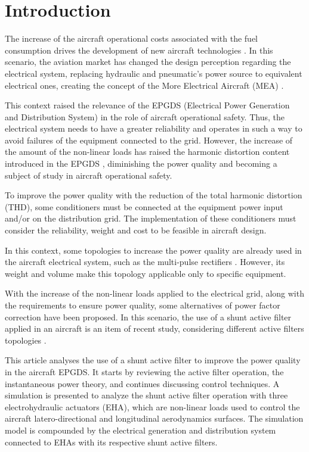 \section{Introduction}

The increase of the aircraft operational costs associated with the fuel consumption drives the development of new aircraft technologies \citep{Babikian2002}. In this scenario, the aviation market has changed the design perception regarding the electrical system, replacing hydraulic and pneumatic’s power source to equivalent electrical ones, creating the concept of the More Electrical Aircraft (MEA) \citep{Moir1999}.

This context raised the relevance of the EPGDS (Electrical Power Generation and Distribution System) in the role of aircraft operational safety. Thus, the electrical system needs to have a greater reliability and operates in such a way to avoid failures of the equipment connected to the grid. However, the increase of the amount of the non-linear loads has raised the harmonic distortion content introduced in the EPGDS \citep{Singer2012}, diminishing the power quality and becoming a subject of study in aircraft operational safety. 

To improve the power quality with the reduction of the total harmonic distortion (THD), some conditioners must be connected at the equipment power input and/or on the distribution grid. The implementation of these conditioners must consider the reliability, weight and cost to be feasible in aircraft design.

In this context, some topologies to increase the power quality are already used in the aircraft electrical system, such as the multi-pulse rectifiers \citep{Zhu2014,Gong2003,Lobo2005}. However, its weight and volume make this topology applicable only to specific equipment.

With the increase of the non-linear loads applied to the electrical grid, along with the requirements to ensure power quality, some alternatives of power factor correction have been proposed. In this scenario, the use of a shunt active filter applied in an aircraft is an item of recent study, considering different active filters topologies \citep{Chen2012research,Chen2012novel,Chen2012control}.

This article analyses the use of a shunt active filter to improve the power quality in the aircraft EPGDS. It starts by reviewing the active filter operation, the instantaneous power theory, and continues discussing control techniques. A simulation is presented to analyze the shunt active filter operation with three electrohydraulic actuators (EHA), which are non-linear loads used to control the aircraft latero-directional and longitudinal aerodynamics surfaces. The simulation model is compounded by the electrical generation and distribution system connected to EHAs with its respective shunt active filters.
